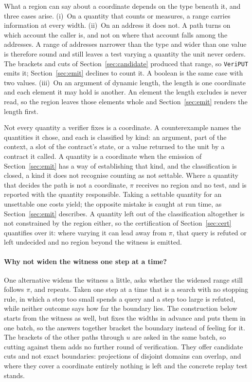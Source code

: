\documentclass[manuscript,anonymous]{acmart}
\newcommand{\tool}[1]{\texttt{#1}}
\begin{document}
What a region can say about a coordinate depends on the type beneath it, and
three cases arise. (i)~On a quantity that counts or measures, a range carries
information at every width. (ii)~On an address it does not. A path turns on
which account the caller is, and not on where that account falls among the
addresses. A range of addresses narrower than the type and wider than one value
is therefore sound and still leaves a test varying a quantity the unit never
orders. The brackets and cuts of Section~\ref{sec:candidate} produced that
range, so \tool{VeriPUT} emits it; Section~\ref{sec:emit} declines to count it.
A boolean is the same case with two values. (iii)~On an argument of dynamic
length, the length is one coordinate and each element it may hold is another. An
element the length excludes is never read, so the region leaves those elements
whole and Section~\ref{sec:emit} renders the length first.

Not every quantity a verifier fixes is a coordinate. A counterexample names the
quantities it chose, and each is classified by kind: an argument, part of the
context, a slot of the contract's state, or a value returned to the unit by a
contract it called. A quantity is a coordinate when the emission of
Section~\ref{sec:emit} has a way of establishing that kind, and the
classification is closed, a kind it does not recognise counting as not settable.
Where a quantity that decides the path is not a coordinate, $\pi$ receives no
region and no test, and is reported with the quantity responsible. Taking a
settable quantity for an unsettable one costs yield; the opposite mistake is
caught at run time, as Section~\ref{sec:emit} describes. A quantity
left out of the classification altogether is not constrained by the region
either, so the certification of Section~\ref{sec:cert} quantifies over it: where
varying it can lead away from $\pi$, that query is refuted or left undecided and
no region beyond the witness is emitted.

\paragraph{Why not widen the witness one step at a time?}
One alternative widens the witness a little, asks whether the widened range
still follows $\pi$, and repeats. Taken one step at a time that is a search with
no stopping rule, in which a step too small spends a query and a step too large
is refuted, while neither outcome says how far the boundary lies. The
construction below starts from the witness as well, but fixes the widths in
advance and puts them in one batch, so the answers together bracket the boundary
instead of feeling for it. The brackets of the other paths through $u$ are asked in the same batch, so
cutting against them adds no further round of verification. They offer candidate
cuts and not exact boundaries: projections of disjoint domains can overlap, and
where they cover a coordinate entirely nothing is left and the concrete replay
test stands.
\end{document}
